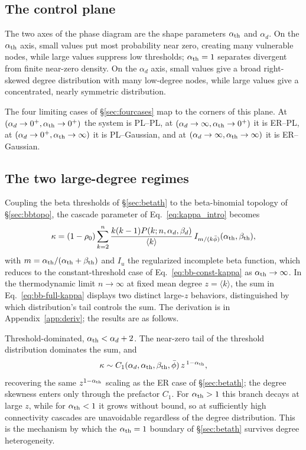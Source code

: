 \documentclass[]{revtex4-2}
\begin{document}
\subsection{The control plane}

The two axes of the phase diagram are the shape parameters $\alpha_{\rm th}$ and $\alpha_d$. On the $\alpha_{\rm th}$ axis, small values put most probability near zero, creating many vulnerable nodes, while large values suppress low thresholds; $\alpha_{\rm th}=1$ separates divergent from finite near-zero density. On the $\alpha_d$ axis, small values give a broad right-skewed degree distribution with many low-degree nodes, while large values give a concentrated, nearly symmetric distribution.

The four limiting cases of \S\ref{sec:fourcases} map to the corners of this plane. At $(\alpha_d\to0^+,\alpha_{\rm th}\to0^+)$ the system is PL--PL, at $(\alpha_d\to\infty,\alpha_{\rm th}\to0^+)$ it is ER--PL, at $(\alpha_d\to0^+,\alpha_{\rm th}\to\infty)$ it is PL--Gaussian, and at $(\alpha_d\to\infty,\alpha_{\rm th}\to\infty)$ it is ER--Gaussian.

\subsection{The two large-degree regimes}

Coupling the beta thresholds of \S\ref{sec:betath} to the beta-binomial topology of \S\ref{sec:bbtopo}, the cascade parameter of Eq.~\eqref{eq:kappa_intro} becomes
\begin{equation}
    \kappa = (1-\rho_0)\sum_{k=2}^n \frac{k(k-1)P(k; n,\alpha_d,\beta_d)}{\langle k\rangle}\,
    I_{m/(k\bar\phi)}(\alpha_{\rm th},\beta_{\rm th}),
    \label{eq:bb-full-kappa}
\end{equation}
with $m=\alpha_{\rm th}/(\alpha_{\rm th}+\beta_{\rm th})$ and $I_u$ the regularized incomplete beta function, which reduces to the constant-threshold case of Eq.~\eqref{eq:bb-const-kappa} as $\alpha_{\rm th}\to\infty$. In the thermodynamic limit $n\to\infty$ at fixed mean degree $z=\langle k\rangle$, the sum in Eq.~\eqref{eq:bb-full-kappa} displays two distinct large-$z$ behaviors, distinguished by which distribution's tail controls the sum. The derivation is in Appendix~\ref{app:deriv}; the results are as follows.

Threshold-dominated, $\alpha_{\rm th}<\alpha_d+2$. The near-zero tail of the threshold distribution dominates the sum, and
\begin{equation}
    \kappa \sim C_1(\alpha_d,\alpha_{\rm th},\beta_{\rm th},\bar\phi)\,
    z^{\,1-\alpha_{\rm th}},
    \label{eq:C1}
\end{equation}
recovering the same $z^{1-\alpha_{\rm th}}$ scaling as the ER case of \S\ref{sec:betath}; the degree skewness enters only through the prefactor $C_1$. For $\alpha_{\rm th}>1$ this branch decays at large $z$, while for $\alpha_{\rm th}<1$ it grows without bound, so at sufficiently high connectivity cascades are unavoidable regardless of the degree distribution. This is the mechanism by which the $\alpha_{\rm th}=1$ boundary of \S\ref{sec:betath} survives degree heterogeneity.
\end{document}
